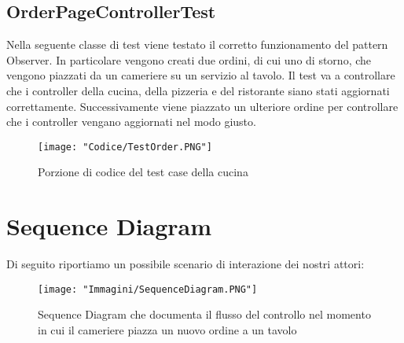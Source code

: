\documentclass{article}
\begin{document}
\newpage

\subsection{OrderPageControllerTest}

Nella seguente classe di test viene testato il corretto funzionamento del pattern Observer. In particolare vengono creati due ordini, di cui uno di storno, che vengono piazzati da un cameriere su un servizio al tavolo. Il test va a controllare che i controller della cucina, della pizzeria e del ristorante siano stati aggiornati correttamente. Successivamente viene piazzato un ulteriore ordine per controllare che i controller vengano aggiornati nel modo giusto.

\begin{figure}[!h]
\centering
\texttt{[image: "Codice/TestOrder.PNG"]}
\caption{Porzione di codice del test case della cucina}
\end{figure}

\newpage

\section{Sequence Diagram}
Di seguito riportiamo un possibile scenario di interazione dei nostri attori:

\begin{figure}[!h]
\centering
\texttt{[image: "Immagini/SequenceDiagram.PNG"]}
\caption{Sequence Diagram che documenta il flusso del controllo nel momento in cui il cameriere piazza un nuovo ordine a un tavolo}
\label{SequenceDiagram}
\end{figure}
\end{document}
